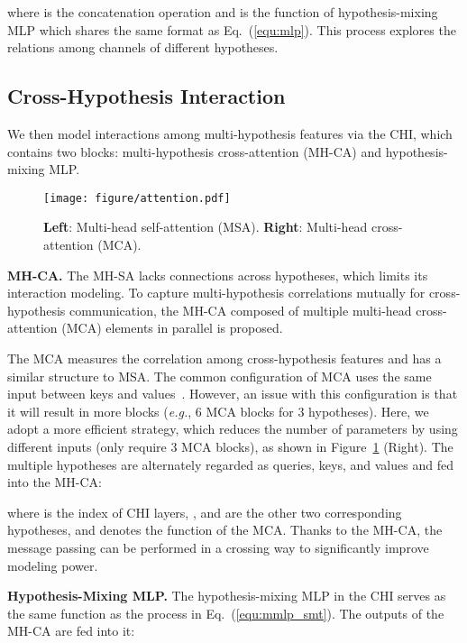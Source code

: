 \documentclass[10pt,twocolumn,letterpaper]{article}
\def\VspaceL{\vspace{-0.40cm}}
\begin{document}
where  is the concatenation operation and  is the function of hypothesis-mixing MLP which shares the same format as Eq.~(\ref{equ:mlp}). 
This process explores the relations among channels of different hypotheses. 

\subsection{Cross-Hypothesis Interaction}
We then model interactions among multi-hypothesis features via the CHI, which contains two blocks: multi-hypothesis cross-attention (MH-CA) and hypothesis-mixing MLP. 

\begin{figure}[tb]
  \centering
  \texttt{[image: figure/attention.pdf]}
  \caption
  {\textbf{Left}: Multi-head self-attention (MSA). 
  \textbf{Right}: Multi-head cross-attention (MCA). 
  }
  \label{fig:attention}
  \VspaceL
\end{figure}

\noindent \textbf{MH-CA.}
The MH-SA lacks connections across hypotheses, which limits its interaction modeling. 
To capture multi-hypothesis correlations mutually for cross-hypothesis communication, the MH-CA composed of multiple multi-head cross-attention (MCA) elements in parallel is proposed. 

The MCA measures the correlation among cross-hypothesis features and has a similar structure to MSA. 
The common configuration of MCA uses the same input between keys and values~\cite{liu2021video,xu2021cdtrans,chen2021crossvit}. 
However, an issue with this configuration is that it will result in more blocks (\textit{e.g.}, 6 MCA blocks for 3 hypotheses). 
Here, we adopt a more efficient strategy, which reduces the number of parameters by using different inputs (only require 3 MCA blocks), as shown in Figure~\ref{fig:attention} (Right). 
The multiple hypotheses  are alternately regarded as queries, keys, and values and fed into the MH-CA:

where  is the index of CHI layers, ,  and  are the other two corresponding hypotheses, and  denotes the function of the MCA. 
Thanks to the MH-CA, the message passing can be performed in a crossing way to significantly improve modeling power. 

\noindent \textbf{Hypothesis-Mixing MLP.}
The hypothesis-mixing MLP in the CHI serves as the same function as the process in Eq.~(\ref{equ:mmlp_smt}). 
The outputs of the MH-CA are fed into it: 
\end{document}
